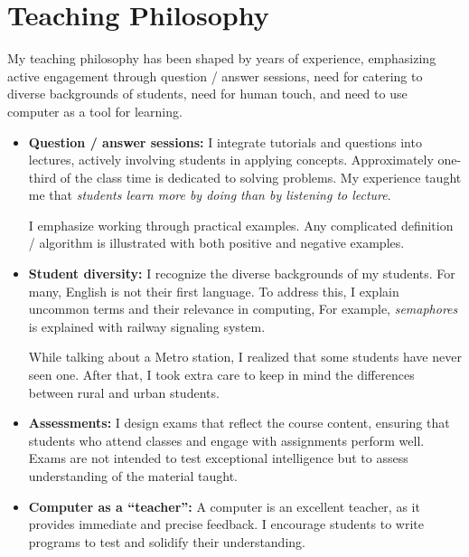 \documentclass[11pt,a4paper,sans]{moderncv} %
\begin{document}
\section{Teaching Philosophy}
My teaching philosophy has been shaped by years of experience, emphasizing active engagement through question / answer sessions, need for catering to diverse backgrounds of students, need for human touch, and need to use computer as a tool for learning.
\begin{itemize}
    \item \textbf{Question / answer sessions:} I integrate tutorials and questions into lectures, actively involving students in applying concepts. Approximately one-third of the class time is dedicated to solving problems. My experience taught me that \emph{students learn more by doing than by listening to lecture}.

    I emphasize working through practical examples. Any complicated definition / algorithm is illustrated with both positive and negative examples.

    \item \textbf{Student diversity:} I recognize the diverse backgrounds of my students. For many, English is not their first language. To address this, I explain uncommon terms and their relevance in computing, For example, \emph{semaphores} is explained with railway signaling system.

    While talking about a Metro station, I realized that some students have never seen one. After that, I took extra care to keep in mind the differences between rural and urban students.


    \item \textbf{Assessments:} I design exams that reflect the course content, ensuring that students who attend classes and engage with assignments perform well. Exams are not intended to test exceptional intelligence but to assess understanding of the material taught.

    \item \textbf{Computer as a ``teacher'':} A computer is an excellent teacher, as it provides immediate and precise feedback. I encourage students to write programs to test and solidify their understanding.


\end{itemize}
\end{document}
